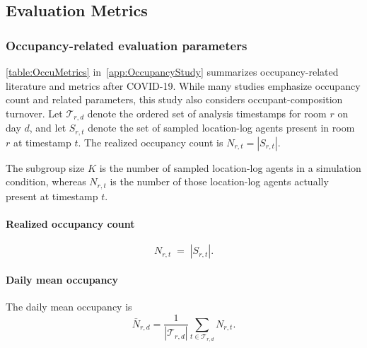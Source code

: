 \subsection{Evaluation Metrics}
\label{sec:EvalMet}

\subsubsection{Occupancy-related evaluation parameters}
\label{sec:OccuMetrics}
\autoref{table:OccuMetrics} in~\autoref{app:OccupancyStudy} summarizes occupancy-related literature and metrics after COVID-19.
While many studies emphasize occupancy count and related parameters, this study also considers occupant-composition turnover.
Let $\mathcal{T}_{r,d}$ denote the ordered set of analysis timestamps for room $r$ on day $d$, and let $S_{r,t}$ denote the set of sampled location-log agents present in room $r$ at timestamp $t$.
The realized occupancy count is $N_{r,t}=|S_{r,t}|$.

The subgroup size $K$ is the number of sampled location-log agents in a simulation condition, whereas $N_{r,t}$ is the number of those location-log agents actually present at timestamp $t$.

\paragraph{Realized occupancy count}
\begin{equation}
N_{r,t} \;=\; |S_{r,t}|.
\label{eq:Nt}
\end{equation}

\paragraph{Daily mean occupancy}
The daily mean occupancy is
\begin{equation}
\bar{N}_{r,d}
=
\frac{1}{|\mathcal{T}_{r,d}|}
\sum_{t\in\mathcal{T}_{r,d}} N_{r,t}.
\label{eq:mean_occ_daily}
\end{equation}


